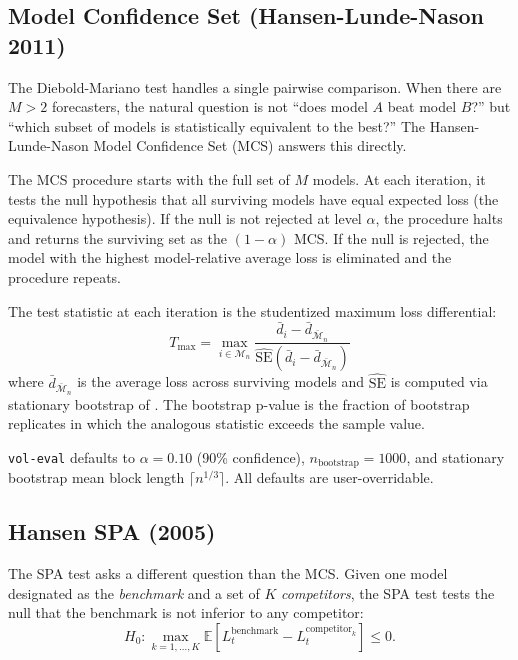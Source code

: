 \subsection{Model Confidence Set (Hansen-Lunde-Nason 2011)}

The Diebold-Mariano test handles a single pairwise comparison. When there are $M > 2$ forecasters, the natural question is not ``does model $A$ beat model $B$?'' but ``which subset of models is statistically equivalent to the best?'' The Hansen-Lunde-Nason Model Confidence Set (MCS) answers this directly.

The MCS procedure starts with the full set of $M$ models. At each iteration, it tests the null hypothesis that all surviving models have equal expected loss (the equivalence hypothesis). If the null is not rejected at level $\alpha$, the procedure halts and returns the surviving set as the $(1-\alpha)$ MCS. If the null is rejected, the model with the highest model-relative average loss is eliminated and the procedure repeats.

The test statistic at each iteration is the studentized maximum loss differential:
\begin{equation}
    T_{\max} = \max_{i \in \mathcal{M}_n} \frac{\bar d_i - \bar d_{\bar{\mathcal{M}}_n}}{\widehat{\text{SE}}(\bar d_i - \bar d_{\bar{\mathcal{M}}_n})}
\end{equation}
where $\bar d_{\bar{\mathcal{M}}_n}$ is the average loss across surviving models and $\widehat{\text{SE}}$ is computed via stationary bootstrap of \citet{PolitisRomano1994}. The bootstrap p-value is the fraction of bootstrap replicates in which the analogous statistic exceeds the sample value.

\texttt{vol-eval} defaults to $\alpha = 0.10$ (90\% confidence), $n_{\text{bootstrap}} = 1000$, and stationary bootstrap mean block length $\lceil n^{1/3}\rceil$. All defaults are user-overridable.

\subsection{Hansen SPA (2005)}

The SPA test asks a different question than the MCS. Given one model designated as the \emph{benchmark} and a set of $K$ \emph{competitors}, the SPA test tests the null that the benchmark is not inferior to any competitor:
\begin{equation}
    H_0: \max_{k=1,\ldots,K} \mathbb{E}[L^{\text{benchmark}}_t - L^{\text{competitor}_k}_t] \le 0.
\end{equation}

